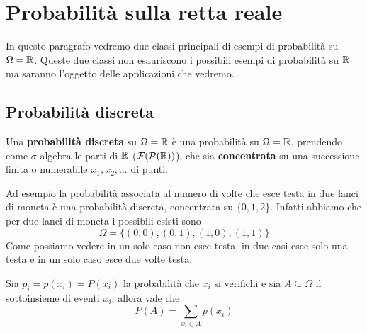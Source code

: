 \section{Probabilità sulla retta reale}
In questo paragrafo vedremo due classi principali di esempi di probabilità su $\Omega = \mathbb{R}$.
Queste due classi non esauriscono i possibili esempi di probabilità su $\mathbb{R}$ ma saranno l'oggetto
delle applicazioni che vedremo.

\subsection{Probabilità discreta}
Una \textbf{probabilità discreta} su $\Omega = \mathbb{R}$ è una probabilità su $\Omega = \mathbb{R}$, prendendo
come $\sigma$-algebra le parti di $\mathbb{R}$ ($\mathcal{F} (\mathcal{P}(\mathbb{R}))$), che sia \textbf{concentrata} su
una successione finita o numerabile $x_1, x_2, \dots$ di punti.

Ad esempio la probabilità associata al numero di volte che esce testa in due lanci di moneta è
una probabilità discreta, concentrata su $\{0,1,2\}$. Infatti abbiamo che per due lanci di moneta
i possibili esisti sono
\[ \Omega = \{ (0,0), (0,1), (1,0), (1,1) \} \]
Come possiamo vedere in un solo caso non esce testa, in due casi esce solo una testa e in un solo
caso esce due volte testa.

\begin{center}
\end{center}

Sia $p_i = p(x_i) = P(x_i)$ la probabilità che $x_i$ si verifichi e sia $A \subseteq \Omega$
il sottoinsieme di eventi $x_i$, allora vale che
\begin{equation}\label{eq: 3.1}
	P(A) = \sum_{x_i \in A} p(x_i)
\end{equation}

